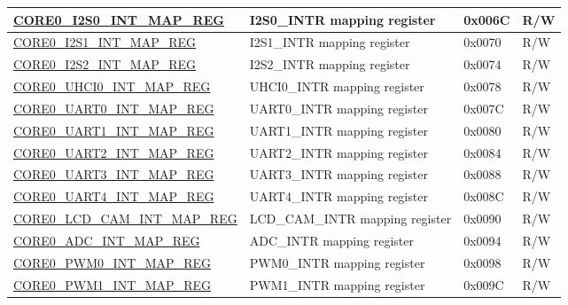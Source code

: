 \begin{longtable}{ | p{7.5cm} | p{7.2cm} | p{1.3cm} | p{1cm} | }
\hyperref[regdesc:CORE0I2S0INTMAPREG]{CORE0\_I2S0\_INT\_MAP\_REG} & I2S0\_INTR mapping register & 0x006C & R/W \\ \hline

\hyperref[regdesc:CORE0I2S1INTMAPREG]{CORE0\_I2S1\_INT\_MAP\_REG} & I2S1\_INTR mapping register & 0x0070 & R/W \\ \hline

\hyperref[regdesc:CORE0I2S2INTMAPREG]{CORE0\_I2S2\_INT\_MAP\_REG} & I2S2\_INTR mapping register & 0x0074 & R/W \\ \hline

\hyperref[regdesc:CORE0UHCI0INTMAPREG]{CORE0\_UHCI0\_INT\_MAP\_REG} & UHCI0\_INTR mapping register & 0x0078 & R/W \\ \hline

\hyperref[regdesc:CORE0UART0INTMAPREG]{CORE0\_UART0\_INT\_MAP\_REG} & UART0\_INTR mapping register & 0x007C & R/W \\ \hline

\hyperref[regdesc:CORE0UART1INTMAPREG]{CORE0\_UART1\_INT\_MAP\_REG} & UART1\_INTR mapping register & 0x0080 & R/W \\ \hline

\hyperref[regdesc:CORE0UART2INTMAPREG]{CORE0\_UART2\_INT\_MAP\_REG} & UART2\_INTR mapping register & 0x0084 & R/W \\ \hline

\hyperref[regdesc:CORE0UART3INTMAPREG]{CORE0\_UART3\_INT\_MAP\_REG} & UART3\_INTR mapping register & 0x0088 & R/W \\ \hline

\hyperref[regdesc:CORE0UART4INTMAPREG]{CORE0\_UART4\_INT\_MAP\_REG} & UART4\_INTR mapping register & 0x008C & R/W \\ \hline

\hyperref[regdesc:CORE0LCDCAMINTMAPREG]{CORE0\_LCD\_CAM\_INT\_MAP\_REG} & LCD\_CAM\_INTR mapping register & 0x0090 & R/W \\ \hline

\hyperref[regdesc:CORE0ADCINTMAPREG]{CORE0\_ADC\_INT\_MAP\_REG} & ADC\_INTR mapping register & 0x0094 & R/W \\ \hline

\hyperref[regdesc:CORE0PWM0INTMAPREG]{CORE0\_PWM0\_INT\_MAP\_REG} & PWM0\_INTR mapping register & 0x0098 & R/W \\ \hline

\hyperref[regdesc:CORE0PWM1INTMAPREG]{CORE0\_PWM1\_INT\_MAP\_REG} & PWM1\_INTR mapping register & 0x009C & R/W \\ \hline


\end{longtable}
